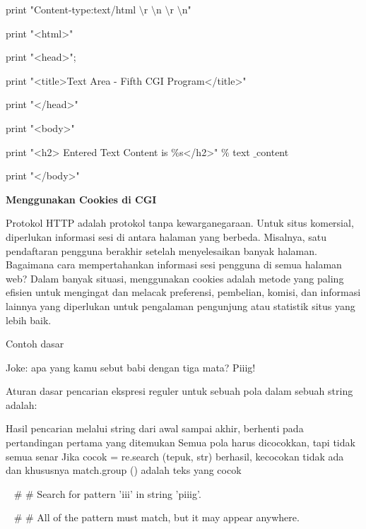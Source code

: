 \begin{12pt}
\begin{12pt}
\begin{12pt}
\begin{12pt}
\begin{12pt}
\begin{12pt}
\begin{12pt}
\vspace{12pt}
\noindent 
print "Content-type:text/html $  \setminus  $r $  \setminus  $n $  \setminus  $r $  \setminus  $n" \par
\noindent 
print "<html>" \par
\noindent 
print "<head>"; \par
\noindent 
print "<title>Text Area - Fifth CGI Program</title>" \par
\noindent 
print "</head>" \par
\noindent 
print "<body>" \par
\noindent 
print "<h2> Entered Text Content is  $  \%  $s</h2>"  $  \%  $ text $  \_  $content \par
\noindent 
print "</body>" \par
\vspace{12pt}
\noindent 
{\fontsize{14pt}{14pt}\selectfont \textbf{Menggunakan Cookies di CGI} \\} \par
\noindent 
Protokol HTTP adalah protokol tanpa kewarganegaraan. Untuk situs komersial, diperlukan informasi sesi di antara halaman yang berbeda. Misalnya, satu pendaftaran pengguna berakhir setelah menyelesaikan banyak halaman. Bagaimana cara mempertahankan informasi sesi pengguna di semua halaman web? Dalam banyak situasi, menggunakan cookies adalah metode yang paling efisien untuk mengingat dan melacak preferensi, pembelian, komisi, dan informasi lainnya yang diperlukan untuk pengalaman pengunjung atau statistik situs yang lebih baik. \par
\noindent 
Contoh dasar \par
\noindent 
Joke: apa yang kamu sebut babi dengan tiga mata? Piiig! \par
\vspace{12pt}
\noindent 
Aturan dasar pencarian ekspresi reguler untuk sebuah pola dalam sebuah string adalah: \par
\noindent 
Hasil pencarian melalui string dari awal sampai akhir, berhenti pada pertandingan pertama yang ditemukan  Semua pola harus dicocokkan, tapi tidak semua senar Jika cocok = re.search (tepuk, str) berhasil, kecocokan tidak ada dan khususnya match.group () adalah teks yang cocok \par
\vspace{12pt}
\noindent 
~  $  \#  $ $  \#  $ Search for pattern 'iii' in string 'piiig'. \par
\noindent 
~  $  \#  $ $  \#  $ All of the pattern must match, but it may appear anywhere. \par

\end{12pt}
\end{12pt}
\end{12pt}
\end{12pt}
\end{12pt}
\end{12pt}
\end{12pt}
